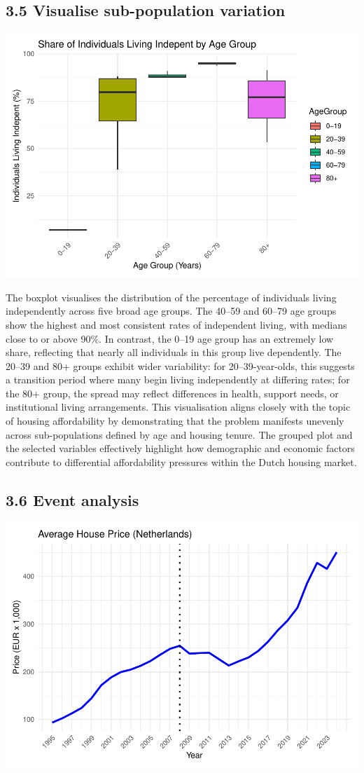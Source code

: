 \documentclass[
]{article}
\begin{document}
\subsection{3.5 Visualise sub-population
variation}\label{visualise-sub-population-variation}

\begin{center}\includegraphics[width=0.52\linewidth,height=0.3\textheight]{r.markdown-group-6_files/figure-latex/visualise subpopulations-1} \end{center}

The boxplot visualises the distribution of the percentage of individuals
living independently across five broad age groups. The 40--59 and 60--79
age groups show the highest and most consistent rates of independent
living, with medians close to or above 90\%. In contrast, the 0--19 age
group has an extremely low share, reflecting that nearly all individuals
in this group live dependently. The 20--39 and 80+ groups exhibit wider
variability: for 20--39-year-olds, this suggests a transition period
where many begin living independently at differing rates; for the 80+
group, the spread may reflect differences in health, support needs, or
institutional living arrangements. This visualisation aligns closely
with the topic of housing affordability by demonstrating that the
problem manifests unevenly across sub-populations defined by age and
housing tenure. The grouped plot and the selected variables effectively
highlight how demographic and economic factors contribute to
differential affordability pressures within the Dutch housing market.

\subsection{3.6 Event analysis}\label{event-analysis}

\begin{center}\includegraphics[width=0.52\linewidth,height=0.3\textheight]{r.markdown-group-6_files/figure-latex/event-analysis-1} \end{center}
\end{document}
